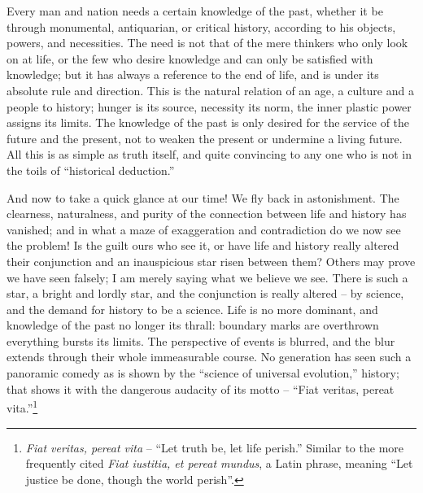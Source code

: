  Every man and nation needs a
certain knowledge of the past, whether it be through monumental,
antiquarian, or critical history, according to his objects, powers,
and necessities. The need is not that of the mere thinkers who only
look on at life, or the few who desire knowledge and can only be
satisfied with knowledge; but it has always a reference to the end of
life, and is under its absolute rule and direction. This is the
natural relation of an age, a culture and a people to history; hunger
is its source, necessity its norm, the inner plastic power assigns
its limits. The knowledge of the past is only desired for the service
of the future and the present, not to weaken the present or undermine
a living future. All this is as simple as truth itself, and quite
convincing to any one who is not in the toils of \enquote{historical
deduction.}

And now to take a quick glance at our time! We fly back in
astonishment. The clearness, naturalness, and purity of the
connection between life and history has vanished; and in what a maze
of exaggeration and contradiction do we now see the problem! Is the
guilt ours who see it, or have life and history really altered their
conjunction and an inauspicious star risen between them? Others may
prove we have seen falsely; I am merely saying what we believe we
see. There is such a star, a bright and lordly star, and the
conjunction is really altered -- by science, and the demand for history
to be a science. Life is no more dominant, and knowledge of the past
no longer its thrall: boundary marks are overthrown everything bursts
its limits. The perspective of events is blurred, and the blur
extends through their whole immeasurable course. No generation has
seen such a panoramic comedy as is shown by the \enquote{science of universal
evolution,} history; that shows it with the dangerous audacity of its
motto -- \enquote{Fiat veritas, pereat vita.}\footnote{\textit{Fiat veritas, pereat vita} -- \enquote{Let truth be, let life perish.} Similar to the more frequently cited \textit{Fiat iustitia, et pereat mundus}, a Latin phrase, meaning \enquote{Let justice be done, though the world perish}.}

